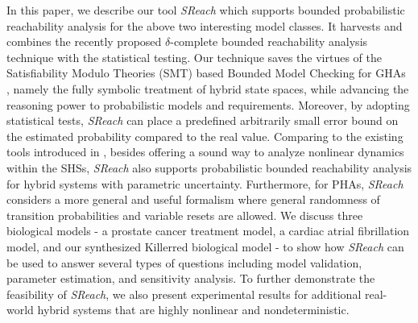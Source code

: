 In this paper, we describe our tool {\it SReach} which supports bounded probabilistic reachability analysis for the above two interesting model classes. It harvests and combines the recently proposed $\delta$-complete bounded reachability analysis technique \cite{gaodelta} with the statistical testing. Our technique saves the virtues of the Satisfiability Modulo Theories (SMT) based Bounded Model Checking for GHAs \cite{cordeiro2012smt, tinelli2012smt}, namely the fully symbolic treatment of hybrid state spaces, while advancing the reasoning power to probabilistic models and requirements. Moreover, by adopting statistical tests, {\it SReach} can place a predefined arbitrarily small error bound on the estimated probability compared to the real value. Comparing to the existing tools introduced in \cite{zhang2012safety, franzle2008stochastic, david2012statistical, website:prism}, besides offering a sound way to analyze nonlinear dynamics within the SHSs, {\it SReach} also supports probabilistic bounded reachability analysis for hybrid systems with parametric uncertainty. Furthermore, for PHAs, {\it SReach} considers a more general and useful formalism where general randomness of transition probabilities and variable resets are allowed. We discuss three biological models - a prostate cancer treatment model, a cardiac atrial fibrillation model, and our synthesized Killerred biological model - to show how {\it SReach} can be used to answer several types of questions including model validation, parameter estimation, and sensitivity analysis. To further demonstrate the feasibility of {\it SReach}, we also present experimental results for additional real-world hybrid systems that are highly nonlinear and nondeterministic.

